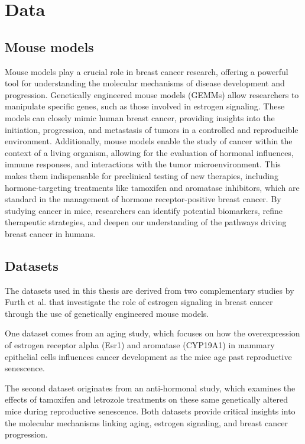 \section{Data}
\label{sec:data}

\subsection{Mouse models}
\label{sec:mouse_models}
Mouse models play a crucial role in breast cancer research, offering a powerful
tool for understanding the molecular mechanisms of disease development and
progression.
Genetically engineered mouse models (GEMMs) allow researchers to manipulate
specific genes, such as those involved in estrogen
signaling\supercite{park_mouse_2018}.
These models can closely mimic human breast cancer, providing insights into the
initiation, progression, and metastasis of tumors in a controlled and
reproducible environment\supercite{pfefferle_transcriptomic_2013}.
Additionally, mouse models enable the study of cancer within the context of a
living organism, allowing for the evaluation of hormonal influences, immune
responses, and interactions with the tumor
microenvironment\supercite{manning_mouse_2016}.
This makes them indispensable for preclinical testing of new therapies,
including hormone-targeting treatments like tamoxifen and aromatase inhibitors,
which are standard in the management of hormone receptor-positive breast
cancer\supercite{fan_endocrine_2015,yin_disruption_2014}.
By studying cancer in mice, researchers can identify potential biomarkers,
refine therapeutic strategies, and deepen our understanding of the pathways
driving breast cancer in humans\supercite{peterson_amphiregulin_2015}.

\subsection{Datasets}
\label{sec:datasets}
The datasets used in this thesis are derived from two complementary studies by
Furth et al.
\supercite{furth_esr1_2023,furth_overexpression_2023}
that investigate the role of estrogen signaling in breast cancer through the
use of genetically engineered mouse models.

One dataset comes from an aging study, which focuses on how the overexpression
of estrogen receptor alpha (Esr1) and aromatase (CYP19A1) in mammary epithelial
cells influences cancer development as the mice age past reproductive
senescence.

The second dataset originates from an anti-hormonal study, which examines the
effects of tamoxifen and letrozole treatments on these same genetically altered
mice during reproductive senescence.
Both datasets provide critical insights into the molecular mechanisms linking
aging, estrogen signaling, and breast cancer progression.

